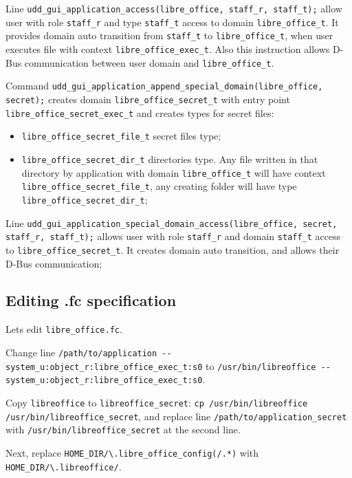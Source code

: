 Line
\texttt{udd\_gui\_application\_access(libre\_office, staff\_r, staff\_t);}
allow user with role \texttt{staff\_r} and type \texttt{staff\_t} access
to domain \texttt{libre\_office\_t}. It provides domain auto transition
from \texttt{staff\_t} to \texttt{libre\_office\_t}, when user executes
file with context \texttt{libre\_office\_exec\_t}. Also this instruction
allows D-Bus communication between user domain and
\texttt{libre\_office\_t}.

Command
\texttt{udd\_gui\_application\_append\_special\_domain(libre\_office, secret);}
creates domain \texttt{libre\_office\_secret\_t} with entry point
\texttt{libre\_office\_secret\_exec\_t} and creates types for secret
files:

\begin{itemize}
\item
  \texttt{libre\_office\_secret\_file\_t} secret files type;
\item
  \texttt{libre\_office\_secret\_dir\_t} directories type. Any file
  written in that directory by application with domain
  \texttt{libre\_office\_t} will have context
  \texttt{libre\_office\_secret\_file\_t}, any creating folder will have
  type \texttt{libre\_office\_secret\_dir\_t};
\end{itemize}

Line
\texttt{udd\_gui\_application\_special\_domain\_access(libre\_office, secret,  staff\_r, staff\_t);}
allows user with role \texttt{staff\_r} and domain \texttt{staff\_t}
access to \texttt{libre\_office\_secret\_t}. It creates domain auto
transition, and allows their D-Bus communication;

\subsection{Editing .fc specification}

Lets edit \texttt{libre\_office.fc}.

Change line
\texttt{/path/to/application -{}- system\_u:object\_r:libre\_office\_exec\_t:s0}
to
\texttt{/usr/bin/libreoffice -{}- system\_u:object\_r:libre\_office\_exec\_t:s0}.

Copy \texttt{libreoffice} to \texttt{libreoffice\_secret}:
\texttt{cp /usr/bin/libreoffice /usr/bin/libreoffice\_secret}, and
replace line \texttt{/path/to/application\_secret} with
\texttt{/usr/bin/libreoffice\_secret} at the second line.

Next, replace
\texttt{HOME\_DIR/\textbackslash{}.libre\_office\_config(/.*)} with
\texttt{HOME\_DIR/\textbackslash{}.libreoffice/}.

